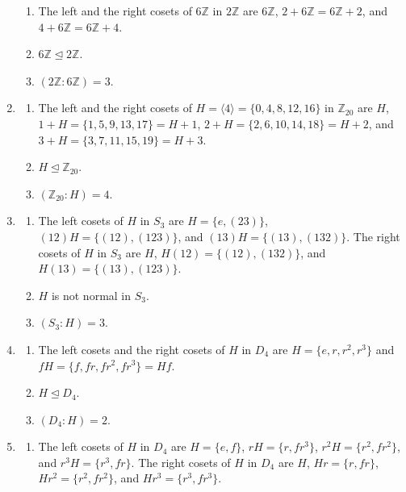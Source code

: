 \documentclass[10pt,]{book}
\theoremstyle{plain}
\theoremstyle{definition}
\theoremstyle{definition}
\theoremstyle{definition}
\theoremstyle{definition}
\numberwithin{equation}{section}
\def\Z{\mathbb{Z}}
\begin{document}
\begin{exerciselist}
\begin{enumerate}[label=(\alph*)]
\begin{enumerate}[label=\roman*.]
\item\hypertarget{li-432}{}The left and the right cosets of \(6\Z\) in \(2\Z\) are \(6\Z\), \(2+6\Z=6\Z+2\), and \(4+6\Z=6\Z+4\).%
\item\hypertarget{li-433}{}\(6\Z \unlhd 2\Z\).%
\item\hypertarget{li-434}{}\((2\Z:6\Z)=3\).%
\end{enumerate}
%
\item\hypertarget{li-435}{}%
\begin{enumerate}[label=\roman*.]
\item\hypertarget{li-436}{}The left and the right cosets of \(H=\langle 4\rangle =\{0,4,8,12,16\}\) in \(\Z_{20}\) are \(H\), \(1+H=\{1,5,9,13,17\}=H+1\), \(2+H=\{2,6,10,14,18\}=H+2\), and \(3+H=\{3,7,11,15,19\}=H+3\).%
\item\hypertarget{li-437}{}\(H \unlhd \Z_{20}\).%
\item\hypertarget{li-438}{}\((\Z_{20}:H)=4\).%
\end{enumerate}
%
\item\hypertarget{li-439}{}%
\begin{enumerate}[label=\roman*.]
\item\hypertarget{li-440}{}The left cosets of \(H\) in \(S_3\) are \(H=\{e,(23)\}\), \((12)H=\{(12),(123)\}\), and \((13)H=\{(13),(132)\}\). The right cosets of \(H\) in \(S_3\) are \(H\), \(H(12)=\{(12),(132)\}\), and \(H(13)=\{(13),(123)\}\).%
\item\hypertarget{li-441}{}\(H\) is not normal in \(S_3\).%
\item\hypertarget{li-442}{}\((S_3:H)=3\).%
\end{enumerate}
%
\item\hypertarget{li-443}{}%
\begin{enumerate}[label=\roman*.]
\item\hypertarget{li-444}{}The left cosets and the right cosets of \(H\) in \(D_4\) are \(H=\{e,r,r^2,r^3\}\) and \(fH=\{f,fr, fr^2, fr^3\}=Hf\).%
\item\hypertarget{li-445}{}\(H\unlhd D_4\).%
\item\hypertarget{li-446}{}\((D_4:H)=2\).%
\end{enumerate}
%
\item\hypertarget{li-447}{}%
\begin{enumerate}[label=\roman*.]
\item\hypertarget{li-448}{}The left cosets of \(H\) in \(D_4\) are \(H=\{e,f\}\), \(rH=\{r,fr^3\}\), \(r^2H=\{r^2,fr^2\}\), and \(r^3H=\{r^3, fr\}\). The right cosets of \(H\) in \(D_4\) are \(H\), \(Hr=\{r, fr\}\), \(Hr^2=\{r^2,fr^2\}\), and \(Hr^3=\{r^3, fr^3\}\).%

\end{enumerate}
\end{enumerate}
\end{exerciselist}
\end{document}
